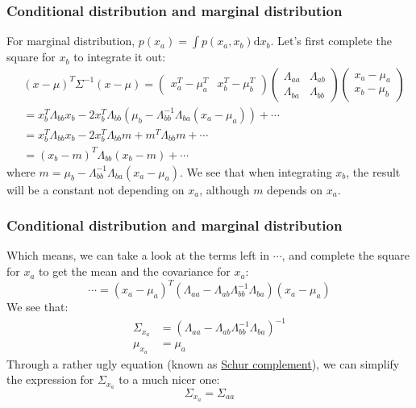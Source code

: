 \documentclass{beamer}
\begin{document}
\begin{frame}
    \frametitle{Conditional distribution and marginal distribution}
    For marginal distribution, $p(x_{a})=\int{}p(x_{a},x_{b})\mathrm{d}x_{b}$. Let's first complete the square for $x_{b}$ to integrate it out:
    \begin{align*}
        &(x-\mu)^{T}\Sigma^{-1}(x-\mu)=\begin{pmatrix}
            x_{a}^{T}-\mu_{a}^{T}&x_{b}^{T}-\mu_{b}^{T}
        \end{pmatrix}
        \begin{pmatrix}
            \Lambda_{aa}&\Lambda_{ab} \\
            \Lambda_{ba}&\Lambda_{bb}
        \end{pmatrix}
        \begin{pmatrix}
            x_{a}-\mu_{a} \\
            x_{b}-\mu_{b}
        \end{pmatrix} \\
        &=x_{b}^{T}\Lambda_{bb}x_{b}-2x_{b}^{T}\Lambda_{bb}(\mu_{b}-\Lambda_{bb}^{-1}\Lambda_{ba}(x_{a}-\mu_{a}))+\cdots \\
        &=x_{b}^{T}\Lambda_{bb}x_{b}-2x_{b}^{T}\Lambda_{bb}m+m^{T}\Lambda_{bb}m+\cdots \\
        &=(x_{b}-m)^{T}\Lambda_{bb}(x_{b}-m)+\cdots
    \end{align*}
    where $m=\mu_{b}-\Lambda_{bb}^{-1}\Lambda_{ba}(x_{a}-\mu_{a})$. We see that when integrating $x_{b}$, the result will be a constant not depending on $x_{a}$, although $m$ depends on $x_{a}$.
\end{frame}

\begin{frame}
    \frametitle{Conditional distribution and marginal distribution}
    Which means, we can take a look at the terms left in $\cdots$, and complete the square for $x_{a}$ to get the mean and the covariance for $x_{a}$:
    \begin{equation*}
        \cdots=(x_{a}-\mu_{a})^{T}(\Lambda_{aa}-\Lambda_{ab}\Lambda_{bb}^{-1}\Lambda_{ba})(x_{a}-\mu_{a})
    \end{equation*}
    We see that:
    \begin{align*}
        \Sigma_{x_{a}}&=(\Lambda_{aa}-\Lambda_{ab}\Lambda_{bb}^{-1}\Lambda_{ba})^{-1} \\
        \mu_{x_{a}}&=\mu_{a}
    \end{align*}
    Through a rather ugly equation (known as \href{https://en.wikipedia.org/wiki/Schur_complement}{Schur complement}), we can simplify the expression for $\Sigma_{x_{a}}$ to a much nicer one:
    \begin{equation*}
        \Sigma_{x_{a}}=\Sigma_{aa}
    \end{equation*}
\end{frame}
\end{document}

